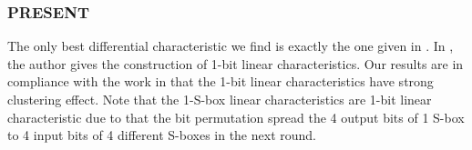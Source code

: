 



\subsubsection{PRESENT} The only best differential characteristic we find is exactly the one given in \cite{wang2008differential}. In \cite{ohkuma2009weak}, the author gives the construction of 1-bit linear characteristics. Our results are in compliance with the work in \cite{ohkuma2009weak} that the 1-bit linear characteristics have strong clustering effect. Note that the 1-S-box linear characteristics are 1-bit linear characteristic due to that the bit permutation spread the 4 output bits of 1 S-box to 4 input bits of 4 different S-boxes in the next round. 

